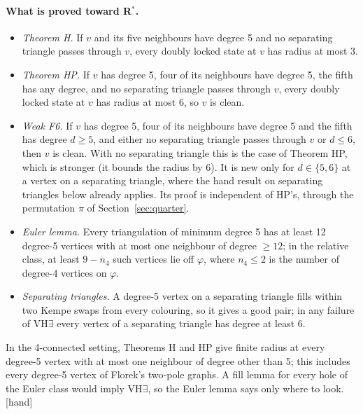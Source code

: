 \documentclass[11pt]{article}
\newcommand{\lab}[1]{\textsf{[#1]}}
\begin{document}
\paragraph{What is proved toward R$^\ast$.}
\begin{itemize}
\item \emph{Theorem H.} If $v$ and its five neighbours have degree 5 and no separating triangle passes through $v$, every doubly locked state at $v$ has radius at most 3.
\item \emph{Theorem HP.} If $v$ has degree 5, four of its neighbours have degree 5, the fifth has any degree, and no separating triangle passes through $v$, every doubly locked state at $v$ has radius at most 6, so $v$ is clean.
\item \emph{Weak F6.} If $v$ has degree 5, four of its neighbours have degree 5 and the fifth has degree $d\ge5$, and either no separating triangle passes through $v$ or $d\le6$, then $v$ is clean. With no separating triangle this is the case of Theorem HP, which is stronger (it bounds the radius by 6). It is new only for $d\in\{5,6\}$ at a vertex on a separating triangle, where the hand result on separating triangles below already applies. Its proof is independent of HP's, through the permutation $\pi$ of Section~\ref{sec:quarter}.
\item \emph{Euler lemma.} Every triangulation of minimum degree 5 has at least 12 degree-5 vertices with at most one neighbour of degree $\ge12$; in the relative class, at least $9-n_4$ such vertices lie off $\varphi$, where $n_4\le2$ is the number of degree-4 vertices on $\varphi$.
\item \emph{Separating triangles.} A degree-5 vertex on a separating triangle fills within two Kempe swaps from every colouring, so it gives a good pair; in any failure of VH$\exists$ every vertex of a separating triangle has degree at least 6.
\end{itemize}
In the 4-connected setting, Theorems H and HP give finite radius at every degree-5 vertex with at most one neighbour of degree other than 5; this includes every degree-5 vertex of Florek's two-pole graphs. A fill lemma for every hole of the Euler class would imply VH$\exists$, so the Euler lemma says only where to look. \lab{hand}
\end{document}
